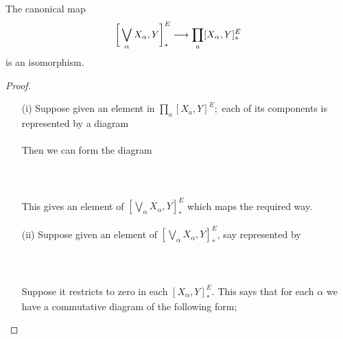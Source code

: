 \documentclass[../main]{subfiles}
\begin{document}
\begin{lemma} \label{lem:p3ch14.10}
The canonical map 
\[
  \bigg[\bigvee_{\alpha}X_{\alpha},Y\bigg]^E_{\ast} \lar{} \prod_{a} [X_{\alpha},Y]^E_{\ast}
\] 
is an isomorphism.
\begin{proof}
  \begin{enumerate} 
    \item [(i)] Suppose given an element in $\prod_{a}\left[X_{a},Y\right]^E;$ each of its components is represented by a diagram\\~\\
      Then we can form the diagram 
      ~\\~\\
      ~\\~\\
      This gives an element of $ \left[\bigvee_{\alpha} X_{\alpha} , Y \right]^E_{\ast}$ which maps the required way.
      \item [(ii)] Suppose given an element of $\left[\bigvee_{\alpha} X_{\alpha}, Y \right]^E_{\ast}$, say represented by 
        ~\\~\\
        ~\\~\\
       Suppose it restricts to zero in each  $ \left[X_{\alpha},Y\right]^E_{\ast}$. This says that for each $\alpha$ we have a commutative diagram of the following form;

\end{enumerate}
\end{proof}
\end{lemma}
\end{document}
